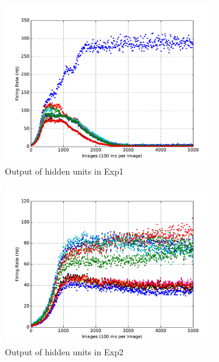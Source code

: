 \begin{figure}
\begin{subfigure}[t]{0.4\textwidth}
		\includegraphics[width=\textwidth]{pics_sdlm/10_exp_SRBM_Orig/exp1_hid_s.pdf}
		\caption{Output of hidden units in Exp1}
	\end{subfigure}
	\begin{subfigure}[t]{0.4\textwidth}
		\includegraphics[width=\textwidth]{pics_sdlm/10_exp_SRBM_Orig/exp2_hid_s.pdf}
		\caption{Output of hidden units in Exp2}
	\end{subfigure}\\
	\begin{subfigure}[t]{0.4\textwidth}

\end{subfigure}
\end{figure}
